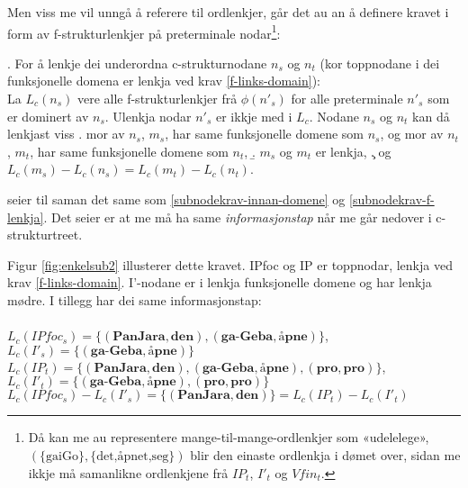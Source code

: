 \documentclass[11pt,a4paper,oneside,draft]{book}
\begin{document}
Men viss me vil unngå å referere til ordlenkjer, går det au an å
definere kravet i form av f-strukturlenkjer på preterminale
nodar\footnote{Då kan me au representere mange-til-mange-ordlenkjer som
        «udelelege», $(\{\text{gaiGo}\},\{\text{det,åpnet,seg}\})$
        blir den einaste ordlenkja i dømet over, sidan me ikkje må
        samanlikne ordlenkjene frå $IP_t$, $I'_t$ og $Vfin_t$. }:

\ex. \label{subnodekrav-infotap} For å lenkje dei underordna
     c-strukturnodane $n_s$ og $n_t$ (kor toppnodane i dei
     funksjonelle domena er lenkja ved
     krav \ref{f-links-domain}):\\
     La $L_c(n_s)$ vere alle
     f-strukturlenkjer frå $\phi(n'_s)$ for alle preterminale $n'_s$
     som er dominert av $n_s$. Ulenkja nodar $n'_s$ er ikkje med i $L_c$.
     Nodane $n_s$ og $n_t$ kan då lenkjast viss
\a.  mor av $n_s$, $m_s$, har same funksjonelle domene som $n_s$,
     og mor av $n_t$, $m_t$, har same funksjonelle domene som $n_t$, 
\b.  $m_s$ og $m_t$ er lenkja, 
\c.  og $L_c(m_s)-L_c(n_s)=L_c(m_t)-L_c(n_t)$.


\Last[a og -b] seier til saman det same som
\ref{subnodekrav-innan-domene} og \ref{subnodekrav-f-lenkja}. Det
\Last[c] seier er at me må ha same \emph{informasjonstap} når me går
nedover i c-strukturtreet.

Figur \ref{fig:enkelsub2} illusterer dette kravet. IPfoc og IP er
toppnodar, lenkja ved krav \ref{f-links-domain}. I'-nodane er i lenkja
funksjonelle domene og har lenkja mødre. I tillegg har dei same
informasjonstap:\\
\\$L_c(IPfoc_s)=\{(\textbf{PanJara},\textbf{den}),(\textbf{ga-Geba},\textbf{åpne})\}$,
$L_c(I'_s)=\{(\textbf{ga-Geba},\textbf{åpne})\}$
\\$L_c(IP_t)=\{(\textbf{PanJara},\textbf{den}),(\textbf{ga-Geba},\textbf{åpne}),(\textbf{pro},\textbf{pro})\}$,
$L_c(I'_t)=\{(\textbf{ga-Geba},\textbf{åpne}),(\textbf{pro},\textbf{pro})\}$
\\$L_c(IPfoc_s)-L_c(I'_s)=\{(\textbf{PanJara},\textbf{den})\}=L_c(IP_t)-L_c(I'_t)$\\
\end{document}
